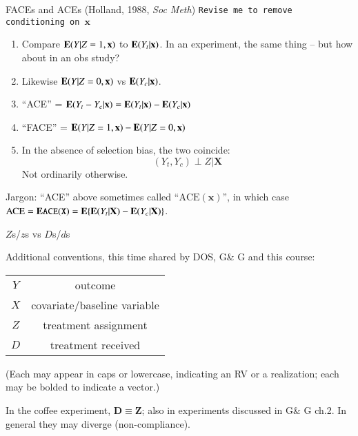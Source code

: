 \begin{frame}{FACEs and ACEs (Holland, 1988, \textit{Soc Meth}) }
\texttt{Revise me to remove conditioning on $\mathbf{x}$}

  \begin{enumerate}[<+->]
  \item   Compare $\mathbf{E}(Y | Z=1, \mathbf{x})$ to $\mathbf{E}(Y_{t}| \mathbf{x})$.  In
  an experiment, the same thing -- but how about in an obs study?
\item Likewise  $\mathbf{E}(Y | Z=0, \mathbf{x})$ vs $\mathbf{E}(Y_{c}| \mathbf{x})$.
\item ``ACE'' = $\mathbf{E}(Y_t - Y_c| \mathbf{x}) = \mathbf{E}(Y_{t}| \mathbf{x}) - \mathbf{E}(Y_{c}| \mathbf{x})$
\item ``FACE'' = $\mathbf{E}(Y | Z=1, \mathbf{x}) - \mathbf{E}(Y | Z=0, \mathbf{x})$
\item In the absence of selection bias, the two coincide:
$$ (Y_{t}, Y_{c}) \perp Z | \mathbf{X}$$
Not ordinarily otherwise.
  \end{enumerate}

Jargon:
``ACE'' above sometimes called ``$\mathrm{ACE}(\mathbf{x})$'',
  in which case $\mathrm{ACE} = \mathbf{E}\mathtt{ACE}(\mathtt{X}) = \mathbf{E}\{ \mathbf{E}(Y_{t}|\mathbf{X}) -
  \mathbf{E}(Y_{c}|\mathbf{X}) \}$.


\end{frame}



\begin{frame}{$Z$s/$z$s vs $D$s/$d$s}
  
Additional conventions, this time shared by DOS, G\& G and this course:

\begin{tabular}{cc}
  $Y$ & outcome \\
  $X$ & covariate/baseline variable\\
  $Z$ & treatment assignment\\
  $D$ & treatment received \\
\end{tabular}
\pause

(Each may appear in caps or lowercase, indicating an RV or a realization; each may be bolded to indicate a vector.) \pause

In the coffee experiment, $\mathbf{D} \equiv \mathbf{Z}$; also in experiments discussed in G\& G ch.2.  In general they may diverge (non-compliance). 

\end{frame}


